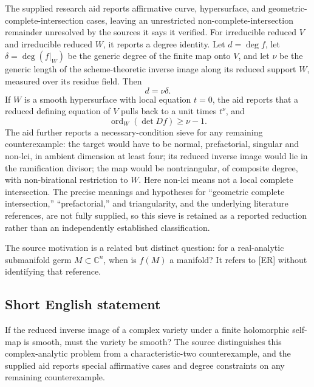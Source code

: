 \documentclass[11pt]{article}
\newcommand{\C}{\mathbb{C}}
\begin{document}
The supplied research aid reports affirmative curve, hypersurface, and geometric-complete-intersection cases, leaving an unrestricted non-complete-intersection remainder unresolved by the sources it says it verified. For irreducible reduced \(V\) and irreducible reduced \(W\), it reports a degree identity. Let \(d=\deg f\), let \(\delta=\deg(f|_W)\) be the generic degree of the finite map onto \(V\), and let \(\nu\) be the generic length of the scheme-theoretic inverse image along its reduced support \(W\), measured over its residue field. Then
\[
d=\nu\delta.
\]
If \(W\) is a smooth hypersurface with local equation \(t=0\), the aid reports that a reduced defining equation of \(V\) pulls back to a unit times \(t^\nu\), and
\[
\operatorname{ord}_W(\det Df)\ge\nu-1.
\]
The aid further reports a necessary-condition sieve for any remaining counterexample: the target would have to be normal, prefactorial, singular and non-lci, in ambient dimension at least four; its reduced inverse image would lie in the ramification divisor; the map would be nontriangular, of composite degree, with non-birational restriction to \(W\). Here non-lci means not a local complete intersection. The precise meanings and hypotheses for ``geometric complete intersection,'' ``prefactorial,'' and triangularity, and the underlying literature references, are not fully supplied, so this sieve is retained as a reported reduction rather than an independently established classification.

The source motivation is a related but distinct question: for a real-analytic submanifold germ \(M\subset\C^n\), when is \(f(M)\) a manifold? It refers to [ER] without identifying that reference.
\subsection{Short English statement}
If the reduced inverse image of a complex variety under a finite holomorphic self-map is smooth, must the variety be smooth? The source distinguishes this complex-analytic problem from a characteristic-two counterexample, and the supplied aid reports special affirmative cases and degree constraints on any remaining counterexample.
\end{document}
